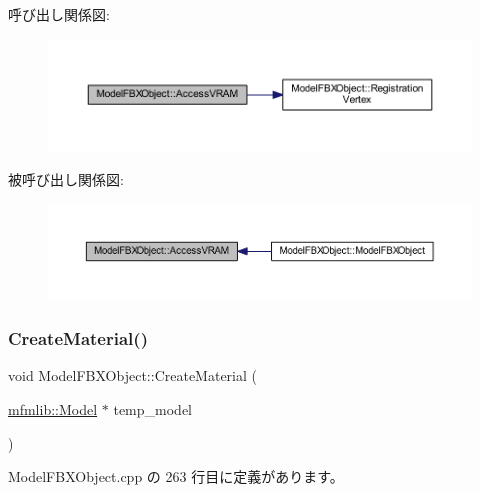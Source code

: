 呼び出し関係図\+:
\nopagebreak
\begin{figure}[H]
\begin{center}
\leavevmode
\includegraphics[width=350pt]{class_model_f_b_x_object_a930e90d4107466549946b1f318857954_cgraph}
\end{center}
\end{figure}
被呼び出し関係図\+:
\nopagebreak
\begin{figure}[H]
\begin{center}
\leavevmode
\includegraphics[width=350pt]{class_model_f_b_x_object_a930e90d4107466549946b1f318857954_icgraph}
\end{center}
\end{figure}
\mbox{\label{class_model_f_b_x_object_a3fba4178f5a21dd3c180cb16f0a05106}} 
\subsubsection{\texorpdfstring{Create\+Material()}{CreateMaterial()}}
{\footnotesize\ttfamily void Model\+F\+B\+X\+Object\+::\+Create\+Material (\begin{DoxyParamCaption}\item[{\mbox{\hyperlink{classmfmlib_1_1_model}{mfmlib\+::\+Model}} $\ast$}]{temp\+\_\+model }\end{DoxyParamCaption})\hspace{0.3cm}{\ttfamily [private]}}



 Model\+F\+B\+X\+Object.\+cpp の 263 行目に定義があります。

